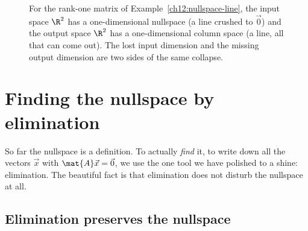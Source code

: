 \begin{figure}[H]
\centering
{}
\caption{For the rank-one matrix of Example~\ref{ch12:nullspace-line}, the input
space $\R^2$ has a one-dimensional nullspace (a line crushed to $\vec 0$) and the
output space $\R^2$ has a one-dimensional column space (a line, all that can come
out). The lost input dimension and the missing output dimension are two sides of
the same collapse.}
\label{ch12:fig-two-spaces}
\end{figure}

\section{Finding the nullspace by elimination}

So far the nullspace is a definition. To actually \emph{find} it, to write down
all the vectors $\vec{x}$ with $\mat{A}\vec{x}=\vec{0}$, we use the one tool we
have polished to a shine: elimination. The beautiful fact is that elimination
does not disturb the nullspace at all.

\subsection{Elimination preserves the nullspace}

